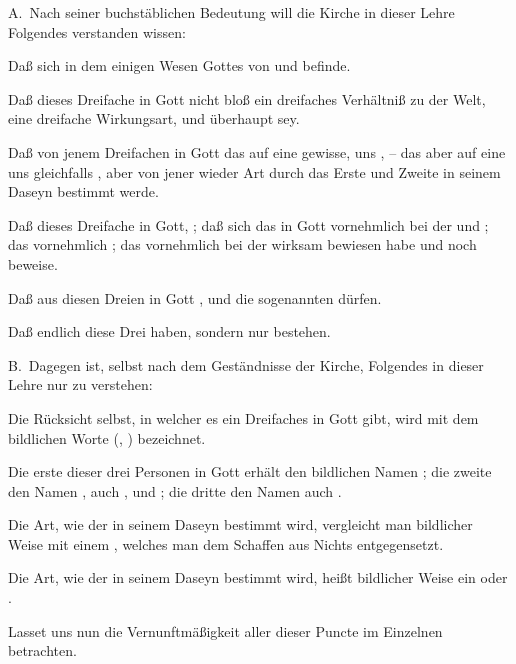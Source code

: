 \vabst A.~Nach seiner buchstäblichen Bedeutung will die Kirche in dieser Lehre Folgendes verstanden wissen:
\begin{aufza}
\item Daß sich in dem einigen Wesen Gottes von  und  befinde.
\item Daß dieses Dreifache in Gott nicht bloß ein dreifaches Verhältniß zu der Welt, eine dreifache Wirkungsart, und überhaupt  sey.
\item Daß von jenem Dreifachen in Gott das  auf eine gewisse, uns , -- das  aber auf eine uns gleichfalls , aber von jener wieder  Art durch das Erste und Zweite in seinem Daseyn bestimmt werde.
\item Daß dieses Dreifache in Gott, ; daß sich das  in Gott vornehmlich bei der  und ; das  vornehmlich ; das  vornehmlich bei der  wirksam bewiesen habe und noch beweise.
\item Daß  aus diesen Dreien in Gott , und  die sogenannten  dürfen.
\item Daß endlich diese Drei  haben, sondern nur  bestehen.
\end{aufza}\par

\vabst B.~Dagegen ist, selbst nach dem Geständnisse der Kirche, Folgendes in dieser Lehre nur  zu verstehen:
\begin{aufza}
\item Die Rücksicht selbst, in welcher es ein Dreifaches in Gott gibt, wird mit dem bildlichen Worte  (,  \ua ) bezeichnet.
\item Die erste dieser drei Personen in Gott erhält den bildlichen Namen ; die zweite den Namen , auch ,  und ; die dritte den Namen  auch .~
\item Die Art, wie der  in seinem Daseyn bestimmt wird, vergleicht man bildlicher Weise mit einem , welches man dem Schaffen aus Nichts entgegensetzt.
\item Die Art, wie der  in seinem Daseyn bestimmt wird, heißt bildlicher Weise ein  oder .
\end{aufza}\par
Lasset uns nun die Vernunftmäßigkeit aller dieser Puncte im Einzelnen betrachten.

